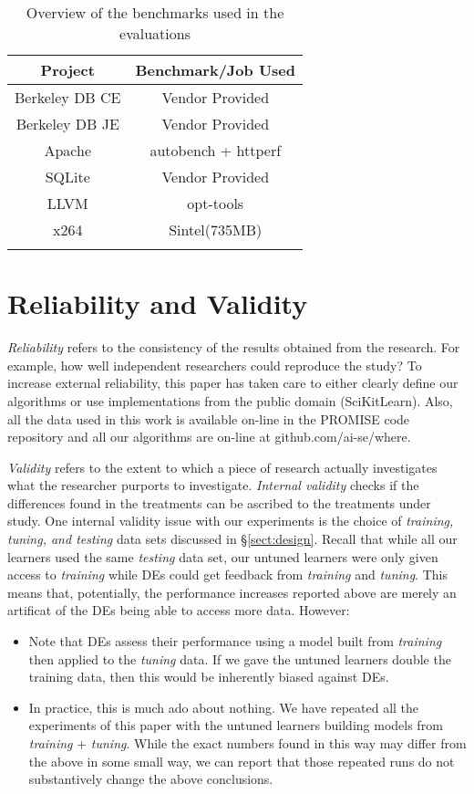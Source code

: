 \documentclass{sig-alternative}
\newcommand{\bi}{\begin{itemize}[leftmargin=0.4cm]}
\newcommand{\ei}{\end{itemize}}
\newcommand{\tion}[1]{\S\ref{sect:#1}}
\begin{document}
 \begin{table*}[!h]
 

 \begin{tabular}{c c } 
 \hline
 Project & Benchmark/Job Used  \\  
 \hline
 Berkeley DB CE & Vendor Provided  \\ 
 
 Berkeley DB JE & Vendor Provided \\

 Apache & autobench + httperf \\

 SQLite & Vendor Provided \\
 
 LLVM & opt-tools \\ 

 x264 & Sintel(735MB) \\
 

\label{BenchMarkUsed} 
\end{tabular}
\caption{Overview of the benchmarks used in the evaluations}
\end{table*}
\section{Reliability and Validity}\label{sect:construct}


{\em Reliability} refers to the consistency of the results obtained
from the research.  For example,   how well independent researchers
could reproduce the study? To increase external
reliability, this paper has taken care to either  clearly define our
algorithms or use implementations from the public domain
(SciKitLearn). Also, all the data used in this work is available
on-line in the PROMISE code repository and all our algorithms
are on-line at github.com/ai-se/where.


{\em Validity} refers to the extent to which a piece of research actually
investigates what the researcher purports to investigate.
{\em Internal validity} checks if the differences found in
the treatments can be ascribed to the treatments under study. 
One internal validity issue with our experiments is the choice
of {\em training, tuning, and testing} data sets discussed in 
\tion{design}. Recall that while all our learners used the same
{\em testing} data set, our untuned learners were only given
access to {\em training} while DEs could get feedback from
{\em training} and
{\em tuning}.  This means that, potentially,  the performance increases
reported above are merely an artificat of the DEs being able to access
more data. However:
\bi
\item Note that
DEs assess their performance using a model built from {\em training}
then applied to the {\em tuning} data. If we gave the untuned
learners double the training data, then this would be inherently
biased against DEs.
\item In practice, this is much ado about nothing. We have
repeated all the experiments of this paper with the untuned
learners building models from {\em training} + {\em tuning}.
While the exact numbers found in this way
may differ from the above in some small way, we can report that 
those repeated runs do not substantively change the above conclusions.
\ei
\end{document}
